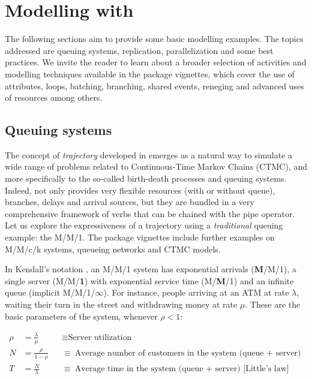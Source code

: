 \documentclass[
  nojss]{jss}
\begin{document}
\section[Modelling with simmer]{Modelling with }

The following sections aim to provide some basic modelling examples. The
topics addressed are queuing systems, replication, parallelization and
some best practices. We invite the reader to learn about a broader
selection of activities and modelling techniques available in the
package vignettes, which cover the use of attributes, loops, batching,
branching, shared events, reneging and advanced uses of resources among
others.

\hypertarget{queuing-systems}{%
\subsection{Queuing systems}\label{queuing-systems}}

The concept of \emph{trajectory} developed in  emerges as a
natural way to simulate a wide range of problems related to
Continuous-Time Markov Chains (CTMC), and more specifically to the
so-called birth-death processes and queuing systems. Indeed,
 not only provides very flexible resources (with or without
queue), branches, delays and arrival sources, but they are bundled in a
very comprehensive framework of verbs that can be chained with the pipe
operator. Let us explore the expressiveness of a  trajectory
using a \emph{traditional} queuing example: the M/M/1. The package
vignettes include further examples on M/M/c/k systems, queueing networks
and CTMC models.

In Kendall's notation \citep{Kendall:1953}, an M/M/1 system has
exponential arrivals (\textbf{M}/M/1), a single server (M/M/\textbf{1})
with exponential service time (M/\textbf{M}/1) and an infinite queue
(implicit M/M/1/\textbf{\(\infty\)}). For instance, people arriving at
an ATM at rate \(\lambda\), waiting their turn in the street and
withdrawing money at rate \(\mu\). These are the basic parameters of the
system, whenever \(\rho < 1\):

\begin{align}
\rho &= \frac{\lambda}{\mu} &&\equiv \mbox{Server utilization} \\
N &= \frac{\rho}{1-\rho} &&\equiv \mbox{Average number of customers in the system (queue $+$ server)} \label{eq:N}\\
T &= \frac{N}{\lambda} &&\equiv \mbox{Average time in the system (queue $+$ server) [Little's law]}
\end{align}
\end{document}
